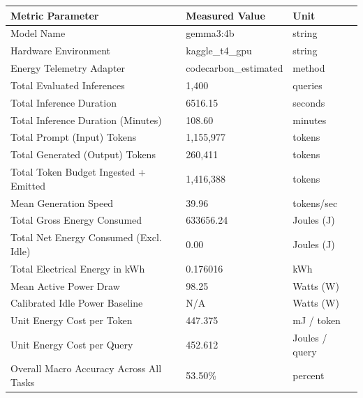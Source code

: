 \begin{tabular}{lll}
\toprule
Metric Parameter & Measured Value & Unit \\
\midrule
Model Name & gemma3:4b & string \\
Hardware Environment & kaggle\_t4\_gpu & string \\
Energy Telemetry Adapter & codecarbon\_estimated & method \\
Total Evaluated Inferences & 1,400 & queries \\
Total Inference Duration & 6516.15 & seconds \\
Total Inference Duration (Minutes) & 108.60 & minutes \\
Total Prompt (Input) Tokens & 1,155,977 & tokens \\
Total Generated (Output) Tokens & 260,411 & tokens \\
Total Token Budget Ingested + Emitted & 1,416,388 & tokens \\
Mean Generation Speed & 39.96 & tokens/sec \\
Total Gross Energy Consumed & 633656.24 & Joules (J) \\
Total Net Energy Consumed (Excl. Idle) & 0.00 & Joules (J) \\
Total Electrical Energy in kWh & 0.176016 & kWh \\
Mean Active Power Draw & 98.25 & Watts (W) \\
Calibrated Idle Power Baseline & N/A & Watts (W) \\
Unit Energy Cost per Token & 447.375 & mJ / token \\
Unit Energy Cost per Query & 452.612 & Joules / query \\
Overall Macro Accuracy Across All Tasks & 53.50\% & percent \\
\bottomrule
\end{tabular}

